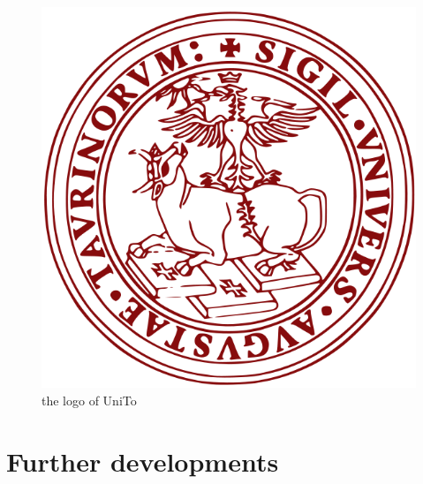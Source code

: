 \begin{figure}
\centering

\includegraphics[scale=0.15]{head/logo.png}
\caption{the logo of UniTo}

\end{figure}


\section[Further developments]{Further developments}